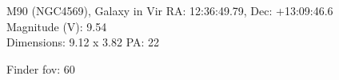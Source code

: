 \begin{block}{M90 (NGC4569), Galaxy in Vir}
    RA: 12:36:49.79, Dec: +13:09:46.6 \\ 
    Magnitude (V): 9.54 \\ 
    Dimensions: 9.12 x 3.82 PA: 22 

    Finder fov: 60 
\end{block}